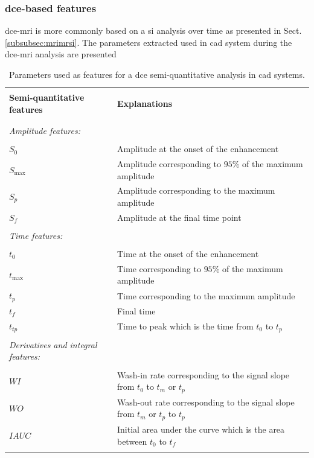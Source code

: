 \subsubsection{\ac{dce}-based features}\label{subsubsec:fddce}

\ac{dce}-\ac{mri} is more commonly based on a \ac{si} analysis over time as presented in Sect. \ref{subsubsec:mrimrsi}. The parameters extracted used in \ac{cad} system during the \ac{dce}-\ac{mri} analysis are presented

\begin{table}
	\caption{Parameters used as features for a \ac{dce} semi-quantitative analysis in \ac{cad} systems.}
	\small
	\begin{tabular}{p{.35\linewidth} p{.60\linewidth}}
		\hline \\ [-1.5ex]
		\textbf{Semi-quantitative features} & \textbf{Explanations} \\ \\ [-1.5ex]
		\hline \\ [-1.5ex]
		\textit{Amplitude features:} & \\ \\ [-1.5ex]
		\quad $S_0$ & Amplitude at the onset of the enhancement \\
		\quad $S_{\max}$ & Amplitude corresponding to $95\%$ of the maximum amplitude \\
		\quad $S_{p}$ & Amplitude corresponding to the maximum amplitude \\
		\quad $S_f$ & Amplitude at the final time point \\ \\ [-1.5ex]
		\textit{Time features:} & \\ \\ [-1.5ex]
		\quad $t_0$ & Time at the onset of the enhancement \\
		\quad $t_{\max}$ & Time corresponding to $95\%$ of the maximum amplitude \\
		\quad $t_{p}$ & Time corresponding to the maximum amplitude \\
		\quad $t_{f}$ & Final time \\
		\quad $t_{tp}$ & Time to peak which is the time from $t_0$ to $t_p$ \\ \\ [-1.5ex]
		\textit{Derivatives and integral features:} & \\ \\ [-1.5ex]
		\quad $WI$ & Wash-in rate corresponding to the signal slope from $t_0$ to $t_m$ or $t_p$ \\
		\quad $WO$ & Wash-out rate corresponding to the signal slope from $t_m$ or $t_p$ to $t_p$ \\
		\quad $IAUC$ & Initial area under the curve which is the area between $t_0$ to $t_{f}$ \\ \\ [-1.5ex]
		\hline
	\end{tabular}
	\label{tab:semiqua}
\end{table}



